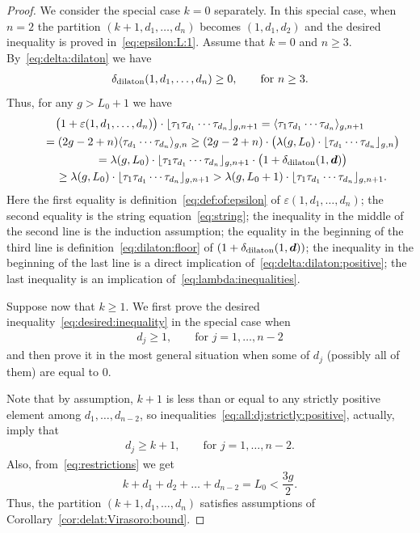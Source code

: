 \documentclass[pdftex]{sigma}
\renewcommand{\epsilon}{\varepsilon}
\theoremstyle{definition}
\begin{document}
\begin{proof}
We consider the special case $k=0$ separately. In this special case,
when $n=2$ the
partition $(k+1,d_1,\dots,d_n)$ becomes $(1,d_1,d_2)$ and the
desired inequality is proved in~\eqref{eq:epsilon:L:1}. Assume that
$k=0$ and $n\ge 3$. By~\eqref{eq:delta:dilaton} we
have
\begin{gather}\label{eq:delta:dilaton:positive}
\delta_{\rm dilaton}(1,d_1,\dots,d_n)\ge 0 ,\qquad\text{for }n\ge 3 .
\end{gather}
Thus, for any $g> L_0+1$ we have
\begin{gather*}
\big(1+\epsilon(1,d_1,\dots,d_n)\big)\cdot \lfloor \tau_1\tau_{d_1} \cdots \tau_{d_n}\rfloor_{g,n+1}=
\langle \tau_1\tau_{d_1} \cdots \tau_{d_n}\rangle_{g,n+1}\\
\qquad{} =(2g-2+n)\langle \tau_{d_1} \cdots \tau_{d_n}\rangle_{g,n}
\ge (2g-2+n)\cdot\big(\lambda(g,L_0)\cdot
\lfloor \tau_{d_1} \cdots \tau_{d_n}\rfloor_{g,n}\big)
\\
\qquad{} =\lambda(g,L_0)\cdot
\lfloor \tau_1\tau_{d_1} \cdots \tau_{d_n}\rfloor_{g,n+1}
\cdot\big(1+\delta_{\rm dilaton}(1,\boldsymbol{d})\big)
\\
\qquad{} \ge \lambda(g,L_0)\cdot
\lfloor \tau_1\tau_{d_1} \cdots \tau_{d_n}\rfloor_{g,n+1}
> \lambda(g,L_0+1)
\cdot
\lfloor \tau_1\tau_{d_1} \cdots \tau_{d_n}\rfloor_{g,n+1} .
\end{gather*}
Here the first equality is
definition~\eqref{eq:def:of:epsilon}
of $\epsilon(1,d_1,\dots,d_n)$; the second equality
is the string equation~\eqref{eq:string}; the
inequality in the middle of the second line is the
induction assumption; the equality in the beginning of the
third line is definition~\eqref{eq:dilaton:floor}
of $(1+\delta_{\rm dilaton}(1,\boldsymbol{d}))$;
the inequality in the beginning of the last line
is a direct implication of~\eqref{eq:delta:dilaton:positive};
the last inequality is an implication of~\eqref{eq:lambda:inequalities}.

Suppose now that $k\ge 1$. We first prove the desired inequality~\eqref{eq:desired:inequality} in the special case when
\begin{gather}\label{eq:all:dj:strictly:positive}
d_j\ge 1 ,\qquad\text{for }j=1,\dots,n-2
\end{gather}
and then prove it in the most general situation when some of $d_j$ (possibly all of them) are equal to $0$.

Note that by assumption, $k+1$ is less than or equal
to any strictly positive element among $d_1,\dots,d_{n-2}$,
so inequalities~\eqref{eq:all:dj:strictly:positive},
actually, imply that
\begin{gather*}%
d_j\ge k+1 ,\qquad\text{for }j=1,\dots,n-2.
\end{gather*}
Also, from~\eqref{eq:restrictions} we get
\[
k+d_1+d_2+\dots+d_{n-2}=L_0<\frac{3g}{2} .
\]
Thus, the partition $(k+1,d_1,\dots,d_n)$
satisfies assumptions of Corollary~\ref{cor:delat:Virasoro:bound}.


\end{proof}
\end{document}
